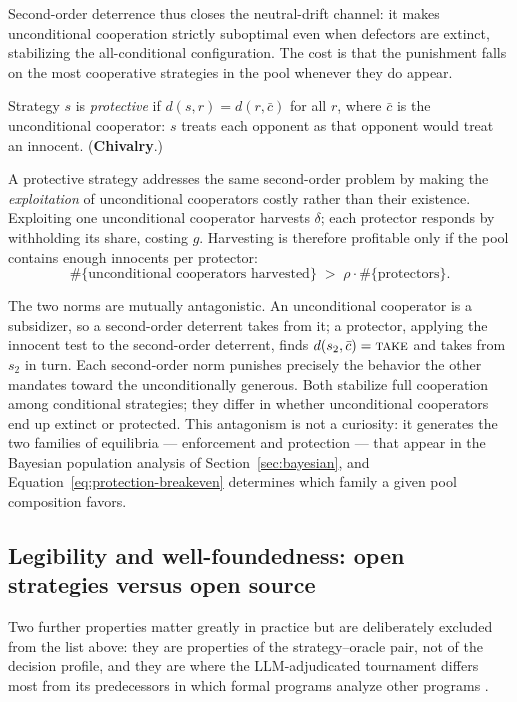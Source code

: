 Second-order deterrence thus closes the neutral-drift channel: it
makes unconditional cooperation strictly suboptimal even when
defectors are extinct, stabilizing the all-conditional configuration.
The cost is that the punishment falls on the most cooperative
strategies in the pool whenever they do appear.

\begin{definition}[Protection]
Strategy $s$ is \emph{protective} if
$d(s, r) = d(r, \bar{c})$ for all $r$, where $\bar{c}$ is the
unconditional cooperator: $s$ treats each opponent as that opponent
would treat an innocent.
(\textbf{Chivalry}.)
\end{definition}

A protective strategy addresses the same second-order problem by
making the \emph{exploitation} of unconditional cooperators costly
rather than their existence.
Exploiting one unconditional cooperator harvests $\delta$; each
protector responds by withholding its share, costing $g$.
Harvesting is therefore profitable only if the pool contains enough
innocents per protector:
\begin{equation}
  \#\{\text{unconditional cooperators harvested}\}
  \;>\; \rho \cdot \#\{\text{protectors}\}.
  \label{eq:protection-breakeven}
\end{equation}

The two norms are mutually antagonistic.
An unconditional cooperator is a subsidizer, so a second-order
deterrent takes from it; a protector, applying the innocent test to
the second-order deterrent, finds
$d(s_2, \bar{c}) = \textup{\textsc{take}}$ and takes from $s_2$ in
turn.
Each second-order norm punishes precisely the behavior the other
mandates toward the unconditionally generous.
Both stabilize full cooperation among conditional strategies; they
differ in whether unconditional cooperators end up extinct or
protected.
This antagonism is not a curiosity: it generates the two families of
equilibria --- enforcement and protection --- that appear in the
Bayesian population analysis of Section~\ref{sec:bayesian}, and
Equation~\eqref{eq:protection-breakeven} determines which family a
given pool composition favors.

\subsection{Legibility and well-foundedness:
open strategies versus open source}
\label{sec:properties-oracle}

Two further properties matter greatly in practice but are
deliberately excluded from the list above: they are properties of the
strategy--oracle pair, not of the decision profile, and they are
where the LLM-adjudicated tournament differs most from its
predecessors in which formal programs analyze other programs
\citep{tennenholtz2004program, ospd2013lesswrong}.

